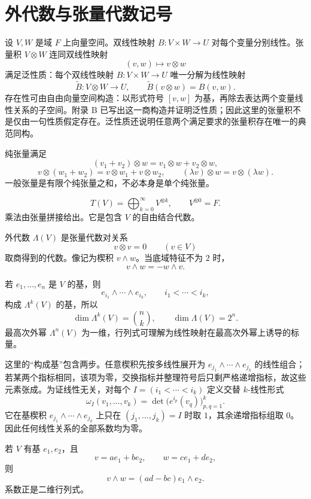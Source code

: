 \section{外代数与张量代数记号}

设 \(V,W\) 是域 \(F\) 上向量空间。双线性映射 \(B:V\times W\to U\) 对每个变量分别线性。张量积 \(V\otimes W\) 连同双线性映射
\[
 (v,w)\longmapsto v\otimes w
\]
满足泛性质：每个双线性映射 \(B:V\times W\to U\) 唯一分解为线性映射
\[
 \widetilde B:V\otimes W\to U,\qquad
 \widetilde B(v\otimes w)=B(v,w).
\]
存在性可由自由向量空间构造：以形式符号 \([v,w]\) 为基，再除去表达两个变量线性关系的子空间。附录 B 已写出这一商构造并证明泛性质；因此这里的张量积不是仅由一句性质假定存在。泛性质还说明任意两个满足要求的张量积存在唯一的典范同构。

纯张量满足
\[
 (v_1+v_2)\otimes w=v_1\otimes w+v_2\otimes w,
\]
\[
 v\otimes(w_1+w_2)=v\otimes w_1+v\otimes w_2,\qquad
 (\lambda v)\otimes w=v\otimes(\lambda w).
\]
一般张量是有限个纯张量之和，不必本身是单个纯张量。

\begin{definition}[张量代数]
\[
 T(V)=\bigoplus_{k=0}^{\infty}V^{\otimes k},
\qquad V^{\otimes0}=F.
\]
乘法由张量拼接给出。它是包含 \(V\) 的自由结合代数。
\end{definition}

\begin{definition}[外代数]
外代数 \(\Lambda(V)\) 是张量代数对关系
\[
 v\otimes v=0\qquad(v\in V)
\]
取商得到的代数。像记为楔积 \(v\wedge w\)。当底域特征不为 \(2\) 时，
\[
 v\wedge w=-w\wedge v.
\]
\end{definition}

若 \(e_1,\ldots,e_n\) 是 \(V\) 的基，则
\[
 e_{i_1}\wedge\cdots\wedge e_{i_k},
\qquad i_1<\cdots<i_k,
\]
构成 \(\Lambda^k(V)\) 的基，所以
\[
 \dim\Lambda^k(V)=\binom nk,\qquad
 \dim\Lambda(V)=2^n.
\]
最高次外幂 \(\Lambda^n(V)\) 为一维，行列式可理解为线性映射在最高次外幂上诱导的标量。

这里的“构成基”包含两步。任意楔积先按多线性展开为
\(e_{j_1}\wedge\cdots\wedge e_{j_k}\) 的线性组合；若某两个指标相同，该项为零，交换指标并整理符号后只剩严格递增指标，故这些元素张成。为证线性无关，对每个
\(I=(i_1<\cdots<i_k)\) 定义交替 \(k\)-线性形式
\[
 \omega_I(v_1,\ldots,v_k)
 =\det\bigl(e^{i_p}(v_q)\bigr)_{p,q=1}^k.
\]
它在基楔积 \(e_{j_1}\wedge\cdots\wedge e_{j_k}\) 上只在
\((j_1,\ldots,j_k)=I\) 时取 \(1\)，其余递增指标组取 \(0\)。因此任何线性关系的全部系数均为零。

\begin{example}[二维面积因子]
若 \(V\) 有基 \(e_1,e_2\)，且
\[
 v=ae_1+be_2,\qquad w=ce_1+de_2,
\]
则
\[
 v\wedge w=(ad-bc)e_1\wedge e_2.
\]
系数正是二维行列式。
\end{example}

